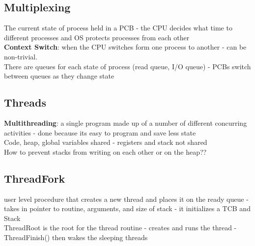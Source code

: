 \documentclass{article}
\begin{document}
\subsection{Multiplexing}
The current state of process held in a PCB - the CPU decides what time to different processes and OS protects processes from each other \\
\textbf{Context Switch}: when the CPU switches form one process to another - can be non-trivial. \\
There are queues for each state of process (read queue, I/O queue) - PCBs switch between queues as they change state \\
\subsection{Threads}
\textbf{Multithreading}: a single program made up of a number of different concurring activities - done because its easy to program and save less state \\
Code, heap, global variables shared - registers and stack not shared \\
How to prevent stacks from writing on each other or on the heap??
\subsection{ThreadFork}
user level procedure that creates a new thread and places it on the ready queue - takes in pointer to routine, arguments, and size of stack - it initializes a TCB and Stack \\
ThreadRoot is the root for the thread routine - creates and runs the thread - ThreadFinish() then wakes the sleeping threads
\end{document}
